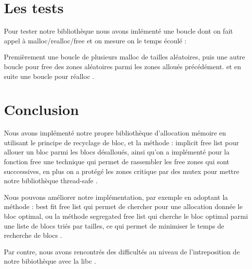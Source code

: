\documentclass[12pt,a4paper]{article}
\begin{document}
\section{Les tests}

Pour tester notre bibliothèque nous avons imlémenté une boucle dont on fait appel à  malloc/realloc/free et on mesure on le temps écoulé : 

Premièrement une boucle de plusieurs malloc de tailles aléatoires, puis une autre boucle pour free des zones aléatoires parmi les zones alloués précédément. et en suite une boucle pour réalloc .







\section{Conclusion}

Nous avons implémenté notre propre bibliothèque d'allocation mémoire en utilisant le principe de recyclage de bloc, et la méthode : implicit free list pour allouer un bloc parmi les blocs désalloués, ainsi qu'on a implémenté pour la fonction free une technique qui permet de rassembler les free zones qui sont succcessives, en plus on a protégé les zones critique par des mutex pour mettre notre bibliothèque thread-safe .

Nous pouvons améliorer notre implémentation, par exemple en adoptant la méthode : best fit free list qui permet de chercher pour une allocation donnée le bloc optimal, ou la méthode segregated free list qui cherche le bloc optimal parmi une liste de blocs triés par tailles, ce qui permet de minimiser le temps de recherche de blocs .


Par contre, nous avons rencontrés des difficultés au niveau de l'intreposition de notre bibiothèque avec la libc .

\pagebreak



\nocite{*} 



\end{document}
